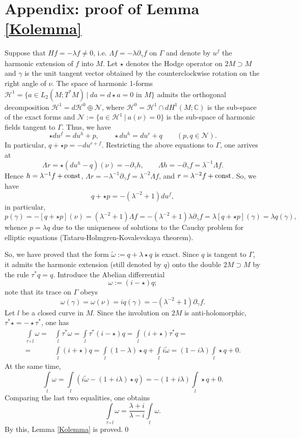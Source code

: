 \documentclass{amsart}
\begin{document}
\section{Appendix: proof of Lemma \ref{Kolemma}}
Suppose that $Hf=-\lambda f\ne 0$, i.e. $\Lambda f=-\lambda\partial_\gamma f$ on $\Gamma$ and denote by $u^f$ the harmonic extension of $f$ into $M$. Let $\star$ denotes the Hodge operator on $2M\supset M$ and $\gamma$ is the unit tangent vector obtained by the counterclockwise rotation on the right angle of $\nu$. The space of harmonic 1-forms $\mathscr{H}^1=\{a\in L_2(M;T^*M) \ | \ da=d\star a = 0 \text{ in } M\}$ admits the orthogonal decomposition $\mathscr{H}^1=d\mathscr{H}^0\oplus\mathscr{N}$, where $\mathscr{H}^0=\mathscr{H}^1\cap dH^1(M;\mathbb{C})$ is the sub-space of the exact forms and $\mathscr{N}:=\{a\in \mathscr{H}^1 \ | \ a(\nu)=0\}$ is the sub-space of harmonic fields tangent to $\Gamma$. Thus, we have
$$\star du^f=du^h+p, \qquad \star du^h=du^r+q \qquad (p,q\in\mathscr{N}).$$
In particular, $q+\star p=-du^{r+f}$. Restricting the above equations to $\Gamma$, one arrives at
$$\Lambda r=\star(du^h-q)(\nu)=-\partial_\gamma h, \qquad \Lambda h=-\partial_\gamma f=\lambda^{-1}\Lambda f.$$
Hence $h=\lambda^{-1}f+{\rm const}$, $\Lambda r=-\lambda^{-1}\partial_\gamma f=\lambda^{-2}\Lambda f$, and $r=\lambda^{-2}f+{\rm const}$. So, we have 
$$q+\star p=-(\lambda^{-2}+1)du^{f},$$ 
in particular, 
$$p(\gamma)=-[q+\star p](\nu)=(\lambda^{-2}+1)\Lambda f=-(\lambda^{-2}+1)\lambda\partial_\gamma f=\lambda[q+\star p](\gamma)=\lambda q(\gamma),$$
whence $p=\lambda q$ due to the uniqueness of solutions to the Cauchy problem for elliptic equations (Tataru-Holmgren-Kovalevskaya theorem). 

So, we have proved that the form $\tilde{\omega}:=q+\lambda\star q$ is exact. Since $q$ is tangent to $\Gamma$, it admits the harmonic extension (still denoted by $q$) onto the double $2M\supset M$ by the rule $\tau^*q=q$. Introduce the Abelian differrential 
$$\omega:=(i-\star)q;$$
note that its trace on $\Gamma$ obeys
\begin{equation}
\label{linear independence}
\omega(\gamma)=\omega(\nu)=iq(\gamma)=-(\lambda^{-2}+1)\partial_\gamma f.
\end{equation}
Let $ l$ be a closed curve in $M$. Since the involution on $2M$ is anti-holomorphic, $\tau^*\star=-\star\tau^*$, one has
\begin{align*}
\int\limits_{\tau\circ l}\omega=&\int\limits_{ l}\tau^*\omega=\int\limits_{ l}\tau^*(i-\star)q=\int\limits_{ l}(i+\star)\tau^*q=\\=&\int\limits_{ l}(i+\star)q=\int\limits_{ l}(1-\lambda)\star q+\int\limits_{ l}i\tilde{\omega}=(1-i\lambda)\int\limits_{ l}\star q+0.
\end{align*}
At the same time,
\begin{equation}
\label{eigenad}
\int\limits_{ l}\omega=\int\limits_{ l}(i\tilde{\omega}-(1+i\lambda)\star q)=-(1+i\lambda)\int\limits_{ l}\star q+0.
\end{equation}
Comparing the last two equalities, one obtains
$$\int\limits_{\tau\circ l}\omega=\frac{\lambda+i}{\lambda-i}\int\limits_{ l}\omega.$$
By this, Lemma \ref{Kolemma} is proved.\qed
\end{document}
